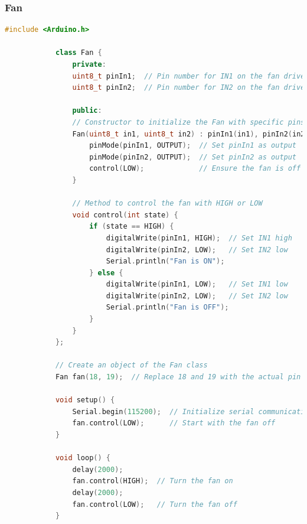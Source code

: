 \documentclass[12pt,a4paper]{book}
\begin{document}
		\subsubsection*{Fan}
		\begin{lstlisting}[language=C++]
			#include <Arduino.h>
			
			class Fan {
				private:
				uint8_t pinIn1;  // Pin number for IN1 on the fan driver
				uint8_t pinIn2;  // Pin number for IN2 on the fan driver
				
				public:
				// Constructor to initialize the Fan with specific pins
				Fan(uint8_t in1, uint8_t in2) : pinIn1(in1), pinIn2(in2) {
					pinMode(pinIn1, OUTPUT);  // Set pinIn1 as output
					pinMode(pinIn2, OUTPUT);  // Set pinIn2 as output
					control(LOW);             // Ensure the fan is off at the start
				}
				
				// Method to control the fan with HIGH or LOW
				void control(int state) {
					if (state == HIGH) {
						digitalWrite(pinIn1, HIGH);  // Set IN1 high
						digitalWrite(pinIn2, LOW);   // Set IN2 low
						Serial.println("Fan is ON");
					} else {
						digitalWrite(pinIn1, LOW);   // Set IN1 low
						digitalWrite(pinIn2, LOW);   // Set IN2 low
						Serial.println("Fan is OFF");
					}
				}
			};
			
			// Create an object of the Fan class
			Fan fan(18, 19);  // Replace 18 and 19 with the actual pin numbers if necessary
			
			void setup() {
				Serial.begin(115200);  // Initialize serial communication at 115200 baud rate
				fan.control(LOW);      // Start with the fan off
			}
			
			void loop() {
				delay(2000);
				fan.control(HIGH);  // Turn the fan on
				delay(2000);
				fan.control(LOW);   // Turn the fan off
			}
		\end{lstlisting}
		
\end{document}
